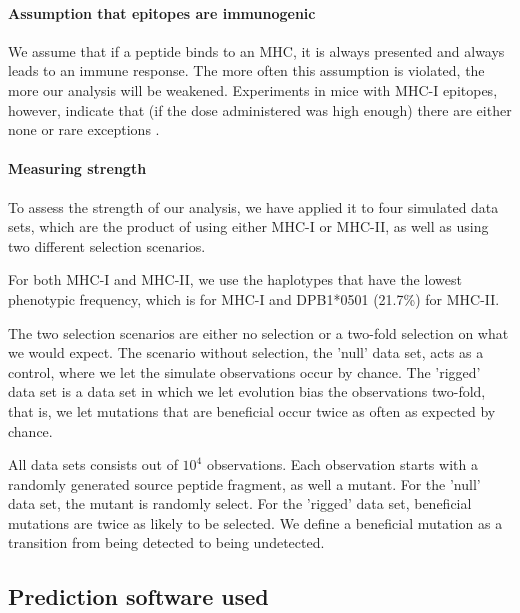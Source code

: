 \paragraph{Assumption that epitopes are immunogenic}

We assume that if a peptide binds to an MHC, it is always presented and always
leads to an immune response.
The more often this assumption is violated, 
the more our analysis will be weakened.
Experiments in mice with MHC-I epitopes, however, indicate that (if the dose 
administered was high enough) there are either none or rare
exceptions \cite{sette1994relationship}.

\paragraph{Measuring strength}

To assess the strength of our analysis, 
we have applied it to four simulated data sets,
which are the product of using either MHC-I or MHC-II,
as well as using two different selection scenarios.

For both MHC-I and MHC-II, we use the haplotypes that have 
the lowest phenotypic frequency, which is  for MHC-I
and DPB1*0501 (21.7\%) for MHC-II.

The two selection scenarios are either no selection
or a two-fold selection on what we would expect.
The scenario without selection, the 'null' data set, acts 
as a control, where we let the simulate observations occur by chance. 
The 'rigged' data set is a data set in which we 
let evolution bias the observations two-fold, that is, 
we let mutations that are beneficial occur twice as often as expected by chance.

All data sets consists out of $10^4$ observations.
Each observation starts with a randomly generated source peptide fragment,
as well a mutant. For the 'null' data set, the mutant is randomly select.
For the 'rigged' data set, beneficial mutations are twice as likely to
be selected. We define a beneficial mutation as a transition from
being detected to being undetected.

\subsection{Prediction software used}

